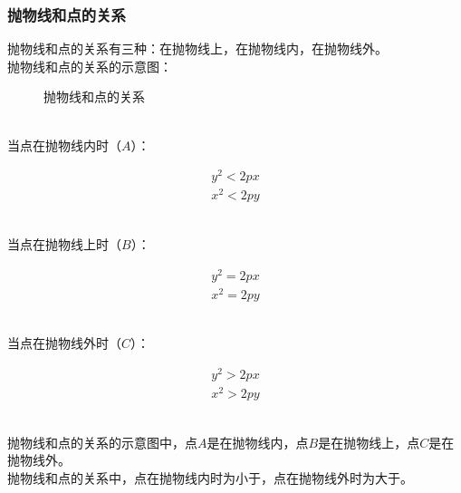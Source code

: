 \documentclass[UTF8]{ctexart}
\begin{document}
\subsubsection{抛物线和点的关系}
    抛物线和点的关系有三种：在抛物线上，在抛物线内，在抛物线外。\\[3mm]
    抛物线和点的关系的示意图：
    \begin{figure}[h!]
        \begin{center}
            \caption{抛物线和点的关系}
        \end{center}
    \end{figure}\\
    当点在抛物线内时（$A$）：
    \begin{large}
        \begin{align*}
            y^2<2px\\[4mm]
            x^2<2py
        \end{align*}
    \end{large}\\
    当点在抛物线上时（$B$）：
    \begin{large}
        \begin{align*}
            y^2=2px\\[4mm]
            x^2=2py
        \end{align*}
    \end{large}\\
    当点在抛物线外时（$C$）：
    \begin{large}
        \begin{align*}
            y^2>2px\\[4mm]
            x^2>2py
        \end{align*}
    \end{large}\\
    抛物线和点的关系的示意图中，点$A$是在抛物线内，点$B$是在抛物线上，点$C$是在抛物线外。\\[3mm]
    抛物线和点的关系中，点在抛物线内时为小于，点在抛物线外时为大于。
\end{document}
